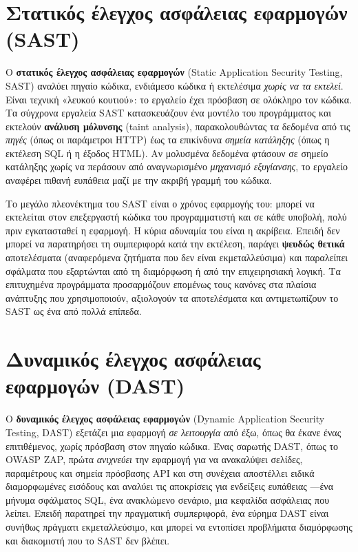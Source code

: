 \section{Στατικός έλεγχος ασφάλειας εφαρμογών (SAST)}\label{sec:10.1}
Ο \textbf{στατικός έλεγχος ασφάλειας εφαρμογών} (Static Application Security Testing, SAST) αναλύει πηγαίο κώδικα, ενδιάμεσο κώδικα ή εκτελέσιμα \emph{χωρίς να τα εκτελεί}. Είναι τεχνική «λευκού κουτιού»: το εργαλείο έχει πρόσβαση σε ολόκληρο τον κώδικα. Τα σύγχρονα εργαλεία SAST κατασκευάζουν ένα μοντέλο του προγράμματος και εκτελούν \textbf{ανάλυση μόλυνσης} (taint analysis), παρακολουθώντας τα δεδομένα από τις \emph{πηγές} (όπως οι παράμετροι HTTP) έως τα επικίνδυνα \emph{σημεία κατάληξης} (όπως η εκτέλεση SQL ή η έξοδος HTML). Αν μολυσμένα δεδομένα φτάσουν σε σημείο κατάληξης χωρίς να περάσουν από αναγνωρισμένο \emph{μηχανισμό εξυγίανσης}, το εργαλείο αναφέρει πιθανή ευπάθεια μαζί με την ακριβή γραμμή του κώδικα.

Το μεγάλο πλεονέκτημα του SAST είναι ο χρόνος εφαρμογής του: μπορεί να εκτελείται στον επεξεργαστή κώδικα του προγραμματιστή και σε κάθε υποβολή, πολύ πριν εγκατασταθεί η εφαρμογή. Η κύρια αδυναμία του είναι η ακρίβεια. Επειδή δεν μπορεί να παρατηρήσει τη συμπεριφορά κατά την εκτέλεση, παράγει \textbf{ψευδώς θετικά} αποτελέσματα (αναφερόμενα ζητήματα που δεν είναι εκμεταλλεύσιμα) και παραλείπει σφάλματα που εξαρτώνται από τη διαμόρφωση ή από την επιχειρησιακή λογική. Τα επιτυχημένα προγράμματα προσαρμόζουν επομένως τους κανόνες στα πλαίσια ανάπτυξης που χρησιμοποιούν, αξιολογούν τα αποτελέσματα και αντιμετωπίζουν το SAST ως ένα από πολλά επίπεδα.

\section{Δυναμικός έλεγχος ασφάλειας εφαρμογών (DAST)}\label{sec:10.2}
Ο \textbf{δυναμικός έλεγχος ασφάλειας εφαρμογών} (Dynamic Application Security Testing, DAST) εξετάζει μια εφαρμογή \emph{σε λειτουργία} από έξω, όπως θα έκανε ένας επιτιθέμενος, χωρίς πρόσβαση στον πηγαίο κώδικα. Ένας σαρωτής DAST, όπως το OWASP ZAP, πρώτα \emph{ανιχνεύει} την εφαρμογή για να ανακαλύψει σελίδες, παραμέτρους και σημεία πρόσβασης API και στη συνέχεια αποστέλλει ειδικά διαμορφωμένες εισόδους και αναλύει τις αποκρίσεις για ενδείξεις ευπάθειας —ένα μήνυμα σφάλματος SQL, ένα ανακλώμενο σενάριο, μια κεφαλίδα ασφάλειας που λείπει. Επειδή παρατηρεί την πραγματική συμπεριφορά, ένα εύρημα DAST είναι συνήθως πράγματι εκμεταλλεύσιμο, και μπορεί να εντοπίσει προβλήματα διαμόρφωσης και διακομιστή που το SAST δεν βλέπει.

